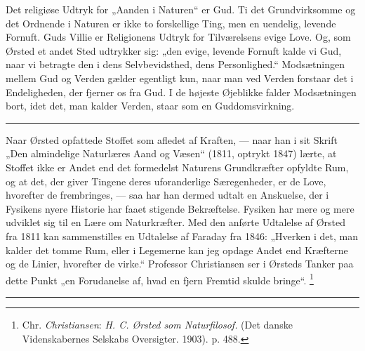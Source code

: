 \documentclass[12pt,a4paper,openany]{book}
\newcommand{\opage}[1]{\marginnote{\footnotesize\textit{[#1]}}}
\begin{document}
Det religiøse Udtryk for „Aanden i Naturen“ er Gud. Ti
\setcounter{footnote}{0}%
\opage{52}det Grundvirksomme og det Ordnende i Naturen er ikke to forskellige
Ting, men en uendelig, levende Fornuft. Guds Villie er Religionens Udtryk for
Tilværelsens evige Love. Og, som Ørsted et andet Sted udtrykker sig: „den
evige, levende Fornuft kalde vi Gud, naar vi betragte den i dens
Selvbevidsthed, dens Personlighed.“ Modsætningen mellem Gud og Verden gælder
egentligt kun, naar man ved Verden forstaar det i Endeligheden, der fjerner os
fra Gud. I de højeste Øjeblikke falder Modsætningen bort, idet det, man kalder
Verden, staar som en Guddomsvirkning.

\begin{center}\rule{2cm}{0.4pt}\end{center}

Naar Ørsted opfattede Stoffet som afledet af Kraften, --- naar han i sit Skrift
„Den almindelige Naturlæres Aand og Væsen“ (1811, optrykt 1847) lærte, at
Stoffet ikke er Andet end det formedelst Naturens Grundkræfter opfyldte Rum, og
at det, der giver Tingene deres uforanderlige Særegenheder, er de Love,
hvorefter de frembringes, --- saa har han dermed udtalt en Anskuelse, der i
Fysikens nyere Historie har faaet stigende Bekræftelse. Fysiken har mere og
mere udviklet sig til en Lære om Naturkræfter. Med den anførte Udtalelse af
Ørsted fra 1811 kan sammenstilles en Udtalelse af Faraday fra 1846: „Hverken i
det, man kalder det tomme Rum, eller i Legemerne kan jeg opdage Andet end
Kræfterne og de Linier, hvorefter de virke.“ Professor Christiansen ser i
Ørsteds Tanker paa dette Punkt „en Forudanelse af, hvad en fjern Fremtid skulde
bringe“.%
\footnote[1]{Chr. \emph{Christiansen}: \textit{H. C. Ørsted som Naturfilosof.}
(Det danske Videnskabernes Selskabs Oversigter. 1903). p. 488.}

\begin{center}\rule{2cm}{0.4pt}\end{center}
\end{document}
